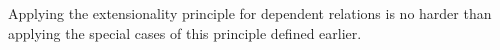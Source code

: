 \ccpad
Applying the extensionality principle for dependent relations is no harder than applying the special cases of this principle defined earlier.%
\ccpad
\begin{code}%
\>[0][@{}l@{\AgdaIndent{1}}]%
\>[1]\AgdaSpace{}%
\AgdaModule{\AgdaUnderscore{}}\AgdaSpace{}%
\AgdaSymbol{(}\AgdaSpace{}%
\AgdaSymbol{:}\AgdaSpace{}%
\AgdaSpace{}%
\AgdaSpace{}%
\AgdaSpace{}%
\AgdaSymbol{)(}\AgdaSpace{}%
\AgdaSymbol{:}\AgdaSpace{}%
\AgdaSymbol{)}\AgdaSpace{}%
\<%
\\
%
\\[\AgdaEmptyExtraSkip]%
\>[1][@{}l@{\AgdaIndent{0}}]%
\>[2]\AgdaSpace{}%
\AgdaSymbol{:}\AgdaSpace{}%
\AgdaSpace{}%
\AgdaSpace{}%
\AgdaSpace{}%
\AgdaSpace{}%
\AgdaSymbol{\{}\AgdaSpace{}%
\AgdaSpace{}%
\AgdaSymbol{:}\AgdaSpace{}%
\AgdaSpace{}%
\AgdaSpace{}%
\AgdaSymbol{\}}\AgdaSpace{}%
\AgdaSpace{}%
\AgdaSpace{}%
\AgdaSpace{}%
\AgdaSpace{}%
\AgdaSpace{}%
\AgdaSpace{}%
\AgdaSpace{}%
\AgdaSpace{}%
\AgdaSpace{}%
\AgdaSpace{}%
\AgdaSpace{}%
\<%
\\
%
\>[2]\AgdaSpace{}%
\AgdaSpace{}%
\AgdaSpace{}%
\AgdaSymbol{=}\AgdaSpace{}%
%
\>[29]\AgdaSpace{}%
\AgdaSpace{}%
%
\>[38]\AgdaSpace{}%
\AgdaSpace{}%
\<%
\end{code}
